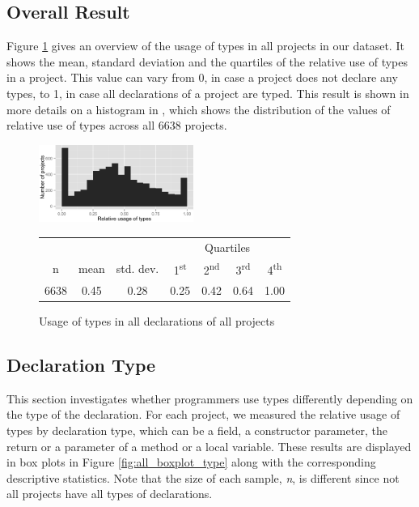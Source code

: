 \documentclass[preprint]{sigplanconf}
\newcommand{\ts}{\textsuperscript}
\begin{document}
\subsection{Overall Result\label{res-overall}}
Figure \ref{fig:all_histogram_all} gives an overview of the usage of types in all projects in our dataset.
It shows the mean, standard deviation and the quartiles of the relative use of types in a project. 
This value can vary from 0, in case a project does not declare any types, to 1, in case all declarations of a project are typed. 
This result is shown in more details on a histogram in , which shows the distribution of the values of relative use of types across all 6638 projects.


\begin{figure}[h]
\centering 
\includegraphics[width=0.45\textwidth]{../analysis/result/all/histograms/5_all_types.png} 

\vspace{0.3cm}
\small
\begin{tabular}{|c|c|c|cccc|}
\hline
{}		&  {}		&  {}			&  \multicolumn{4}{c|}{Quartiles}				\\
n		& mean	& std. dev.	& 1\ts{st}	& 2\ts{nd}	& 3\ts{rd}	& 4\ts{th}		\\
\hline
\hline
6638 	& 0.45	& 0.28		& 0.25	& 0.42		& 0.64	& 1.00		\\
\hline
\end{tabular}


\caption{Usage of types in all declarations of all projects}
\label{fig:all_histogram_all} 
\end{figure}



\subsection{Declaration Type\label{sub:res_all_type}}
This section investigates whether programmers use types differently depending on the type of the declaration.
For each project, we measured the relative usage of types by declaration type, which can be a field, a constructor parameter, the return or a parameter of a method or a local variable.
These results are displayed in box plots in Figure \ref{fig:all_boxplot_type} along with the corresponding descriptive statistics.
Note that the size of each sample, \emph{n}, is different since not all projects have all types of declarations. 
\end{document}
